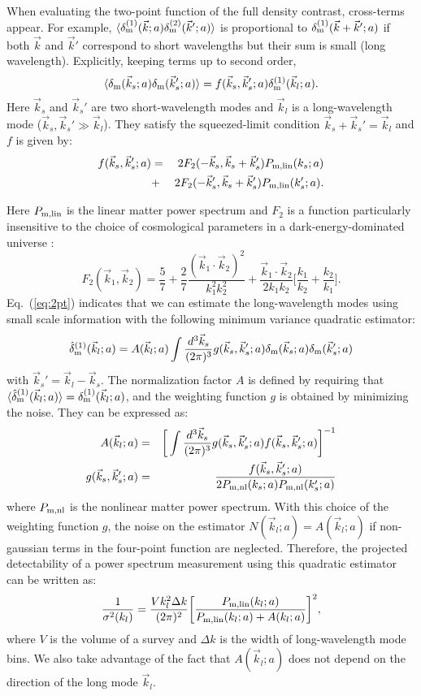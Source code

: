 \documentclass[prd,amsmath,amssymb,floatfix,superscriptaddress,nofootinbib,twocolumn]{revtex4-1}
\def\be{\begin{equation}}
\def\ee{\end{equation}}
\def\bea{\begin{eqnarray}}
\def\eea{\end{eqnarray}}
\newcommand{\vs}{\nonumber\\}
\newcommand{\vk}{\vec{k}}
\newcommand{\ec}[1]{Eq.~(\ref{eq:#1})}
\newcommand{\eql}[1]{\label{eq:#1}}
\begin{document}
When evaluating the two-point function of the full density contrast, cross-terms appear. For example, $\langle \delta_{\rm m}^{(1)}(\vk;a) \delta_{\rm m}^{(2)}(\vk';a) \rangle$ is proportional to $\delta^{(1)}_{\rm m}(\vk+\vk';a)$ if both $\vk$ and $\vk'$ correspond to short wavelengths but their sum is small (long wavelength). Explicitly, keeping terms up to second order, 
\be
\langle {\delta}_{\rm m}(\vec{k}_s;a){\delta}_{\rm m}(\vec{k}_s';a) \rangle =f(\vec{k}_s,\vec{k}_s';a){\delta}^{(1)}_{\rm m}(\vec{k}_l;a). \eql{2pt}
\ee 
Here $\vk_s$ and $\vk_s'$ are two short-wavelength modes and $\vk_l$ is a long-wavelength mode ($\vk_s,\vk_s' \gg \vk_l$). They satisfy the squeezed-limit condition $\vk_s+\vk_s'=\vk_l$ and $f$ is given by:
\bea
f(\vec{k}_s,\vec{k}_s';a)&=&2F_2(-\vec{k}_s,\vec{k}_s+\vec{k}_s')P_{\rm m,lin}(k_s;a)\vs
&+&2F_2(-\vec{k}_s',\vec{k}_s+\vec{k}_s')P_{\rm m,lin}(k_s';a)       .\eql{deff}
\eea 

\vspace*{22.6\baselineskip} 

Here $P_{\rm m,lin}$ is the linear matter power spectrum and $F_{2}$ is a function particularly insensitive to the choice of cosmological parameters in a dark-energy-dominated universe \cite{Takahashi:2008to}:
\be
F_{2}(\vk_1,\vk_2)=\frac{5}{7}+\frac{2}{7}\frac{(\vk_1\cdot \vk_2)^2}{k_1^2 k_2^2}+\frac{\vk_1\cdot \vk_2}{2k_1k_2}\bigg[\frac{k_1}{k_2}+\frac{k_2}{k_1}\bigg].\eql{f2}
\ee
\ec{2pt} indicates that we can estimate the long-wavelength modes using small scale information with the following minimum variance quadratic estimator:
\begin{eqnarray}
\hat{\delta}^{(1)}_{\rm m}(\vec{k}_l;a)=A(\vec{k}_l;a)\int \frac{d^3 \vec{k}_s}{(2\pi)^3} g(\vec{k}_s,\vec{k}_s';a){\delta}_{\rm m}(\vec{k}_s;a){\delta}_{\rm m}(\vec{k}_s';a)\vs \eql{quadest}
\end{eqnarray} 
with $\vk_s'=\vk_l-\vk_s$. The normalization factor $A$ is defined by requiring that $\langle \hat{\delta}_{\rm m}^{(1)}(\vec{k}_l;a) \rangle={\delta}_{\rm m}^{(1)}(\vec{k}_l;a)$, and the weighting function $g$ is obtained by minimizing the noise. They can be expressed as:
\begin{eqnarray}
A(\vec{k}_l;a)&=&\bigg[\int \frac{d^3 \vec{k}_s}{(2\pi)^3} g(\vec{k}_s,\vec{k}_s';a)f(\vec{k}_s,\vec{k}_s';a)  \bigg]^{-1} \eql{a} \vs
g(\vec{k}_{s},\vec{k}_{s}';a)&=&\frac{f(\vec{k}_{s},\vec{k}_{s}';a)}{2P_{\rm m,nl}(k_{s};a)P_{\rm m,nl}(k_{s}';a)}
\end{eqnarray}
where $P_{\rm m,nl}$ is the nonlinear matter power spectrum. With this choice of the weighting function $g$, the noise on the estimator $N(\vk_l;a)=A(\vk_l;a)$ if non-gaussian terms in the four-point function are neglected. Therefore, the projected detectability of a power spectrum measurement using this quadratic estimator can be written as:
\be
\frac{1}{\sigma^{2}(k_l)}=\frac{V k_l^2 \Delta k }{(2\pi)^2}\bigg[\frac{P_{\rm m,lin}(k_l;a)}{P_{\rm m,lin}(k_l;a)+A(k_l;a) }\bigg]^2 \eql{error},
\ee
where $V$ is the volume of a survey and $\Delta k$ is the width of long-wavelength mode bins. We also take advantage of the fact that $A(\vk_l;a)$ does not depend on the direction of the long mode $\vk_l$.
\end{document}
